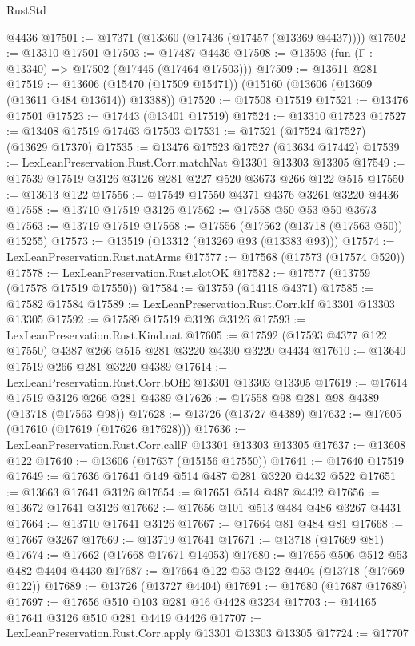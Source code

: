 \begin{lexlean}{RustStd}
\begin{coremodule}
    @4436
@17501 := @17371 (@13360 (@17436 (@17457 (@13369 @4437))))
@17502 := @13310 @17501
@17503 := @17487 @4436
@17508 := @13593 (fun (Γ : @13340) => @17502 (@17445 (@17464 @17503)))
@17509 := @13611 @281
@17519 := @13606 (@15470 (@17509 @15471)) (@15160 (@13606 (@13609 (@13611 @484 @13614)) @13388))
@17520 := @17508 @17519
@17521 := @13476 @17501
@17523 := @17443 (@13401 @17519)
@17524 := @13310 @17523
@17527 := @13408 @17519 @17463 @17503
@17531 := @17521 (@17524 @17527) (@13629 @17370)
@17535 := @13476 @17523 @17527 (@13634 @17442)
@17539 := LexLeanPreservation.Rust.Corr.matchNat @13301 @13303 @13305
@17549 := @17539 @17519 @3126 @3126 @281 @227 @520 @3673 @266 @122 @515
@17550 := @13613 @122
@17556 := @17549 @17550 @4371 @4376 @3261 @3220 @4436
@17558 := @13710 @17519 @3126
@17562 := @17558 @50 @53 @50 @3673
@17563 := @13719 @17519
@17568 := @17556 (@17562 (@13718 (@17563 @50)) @15255)
@17573 := @13519 (@13312 (@13269 @93 (@13383 @93)))
@17574 := LexLeanPreservation.Rust.natArms
@17577 := @17568 (@17573 (@17574 @520))
@17578 := LexLeanPreservation.Rust.slotOK
@17582 := @17577 (@13759 (@17578 @17519 @17550))
@17584 := @13759 (@14118 @4371)
@17585 := @17582 @17584
@17589 := LexLeanPreservation.Rust.Corr.kIf @13301 @13303 @13305
@17592 := @17589 @17519 @3126 @3126
@17593 := LexLeanPreservation.Rust.Kind.nat
@17605 := @17592 (@17593 @4377 @122 @17550) @4387 @266 @515 @281 @3220 @4390 @3220 @4434
@17610 := @13640 @17519 @266 @281 @3220 @4389
@17614 := LexLeanPreservation.Rust.Corr.bOfE @13301 @13303 @13305
@17619 := @17614 @17519 @3126 @266 @281 @4389
@17626 := @17558 @98 @281 @98 @4389 (@13718 (@17563 @98))
@17628 := @13726 (@13727 @4389)
@17632 := @17605 (@17610 (@17619 (@17626 @17628)))
@17636 := LexLeanPreservation.Rust.Corr.callF @13301 @13303 @13305
@17637 := @13608 @122
@17640 := @13606 (@17637 (@15156 @17550))
@17641 := @17640 @17519
@17649 := @17636 @17641 @149 @514 @487 @281 @3220 @4432 @522
@17651 := @13663 @17641 @3126
@17654 := @17651 @514 @487 @4432
@17656 := @13672 @17641 @3126
@17662 := @17656 @101 @513 @484 @486 @3267 @4431
@17664 := @13710 @17641 @3126
@17667 := @17664 @81 @484 @81
@17668 := @17667 @3267
@17669 := @13719 @17641
@17671 := @13718 (@17669 @81)
@17674 := @17662 (@17668 @17671 @14053)
@17680 := @17656 @506 @512 @53 @482 @4404 @4430
@17687 := @17664 @122 @53 @122 @4404 (@13718 (@17669 @122))
@17689 := @13726 (@13727 @4404)
@17691 := @17680 (@17687 @17689)
@17697 := @17656 @510 @103 @281 @16 @4428 @3234
@17703 := @14165 @17641 @3126 @510 @281 @4419 @4426
@17707 := LexLeanPreservation.Rust.Corr.apply @13301 @13303 @13305
@17724 := @17707

\end{coremodule}
\end{lexlean}
